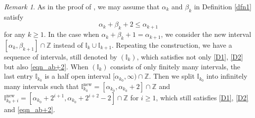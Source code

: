 \documentclass{amsart}
\theoremstyle{plain}
\theoremstyle{definition}
\theoremstyle{remark}
\newtheorem{remark}[thm]{Remark}
\numberwithin{equation}{section}
\begin{document}
\begin{remark}\label{r_ab+2}
As in the proof of \cite[Lemma 2.2]{KNS}, we may assume that $\alpha_k$ and $\beta_k$ in Definition \ref{dfn1} satisfy  
\begin{equation}\label{eqn_ab+2}
\alpha_k+\beta_k+2\leq \alpha_{k+1}
\end{equation}
for any $k\geq 1$.
In the case when $\alpha_k+\beta_k+1=\alpha_{k+1}$, we consider the new interval 
$[\alpha_k,\beta_{k+1}]\cap \mathbb{Z}$ instead of $\mathbb{I}_k\cup \mathbb{I}_{k+1}$. 
Repeating the construction, we have a sequence of intervals, still denoted by $(\mathbb{I}_k)$,  which satisfies not only \eqref{D1}, \eqref{D2} but also \eqref{eqn_ab+2}.
When $(\mathbb{I}_k)$ consists of only finitely many intervals, 
the last entry $\mathbb{I}_{k_0}$ is a half open interval $[\alpha_{k_0},\infty)\cap 
\mathbb{Z}$.
Then we split $\mathbb{I}_{k_0}$ into infinitely many intervals such that
$\mathbb{I}_{k_0}^{\mathrm{new}}=[\alpha_{k_0},\alpha_{k_0}+2]\cap \mathbb{Z}$ and 
$\mathbb{I}_{k_0+i}^{\mathrm{new}}=[\alpha_{k_0}+2^{i+1},\alpha_{k_0}
+2^{i+2}-2]\cap\mathbb{Z}$ for $i\geq 1$, 
which still satisfies \eqref{D1}, \eqref{D2} and \eqref{eqn_ab+2}.
\end{remark}
\end{document}
